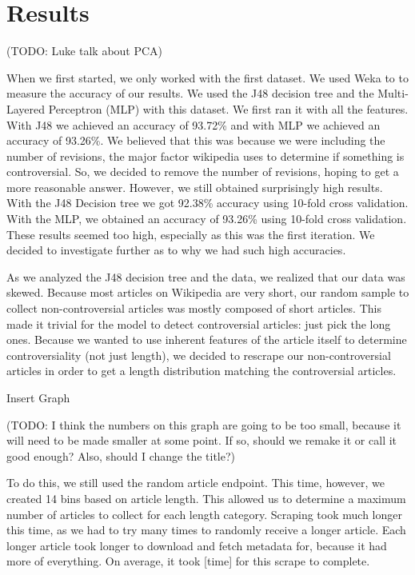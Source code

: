 \documentclass{article}
\begin{document}
\section{Results}

(TODO: Luke talk about PCA)

When we first started, we only worked with the first dataset. 
We used Weka to to measure the accuracy of our results. 
We used the J48 decision tree and the Multi-Layered Perceptron (MLP) with this dataset.
We first ran it with all the features. 
With J48 we achieved an accuracy of 93.72\% and with MLP we achieved an accuracy of 93.26\%.
We believed that this was because we were including the number of revisions, the major factor wikipedia uses to determine if something is controversial.
So, we decided to remove the number of revisions, hoping to get a more reasonable answer. 
However, we still obtained surprisingly high results. With the J48 Decision tree we got 92.38\% accuracy using 10-fold cross validation. With the MLP, we obtained an accuracy of 93.26\% using 10-fold cross validation. 
These results seemed too high, especially as this was the first iteration. 
We decided to investigate further as to why we had such high accuracies.

As we analyzed the J48 decision tree and the data, we realized that our data was skewed. 
Because most articles on Wikipedia are very short, our random sample to collect non-controversial articles was mostly composed of short articles. 
This made it trivial for the model to detect controversial articles: just pick the long ones. 
Because we wanted to use inherent features of the article itself to determine controversiality (not just length), we decided to rescrape our non-controversial articles in order to get a length distribution matching the controversial articles.

Insert Graph

(TODO: I think the numbers on this graph are going to be too small, because it will need to be made smaller at some point. If so, should we remake it or call it good enough? Also, should I change the title?)

To do this, we still used the random article endpoint.
This time, however, we created 14 bins based on article length.
This allowed us to determine a maximum number of articles to collect for each length category. 
Scraping took much longer this time, as we had to try many times to randomly receive a longer article. 
Each longer article took longer to download and fetch metadata for, because it had more of everything. 
On average, it took [time] for this scrape to complete.
\end{document}
